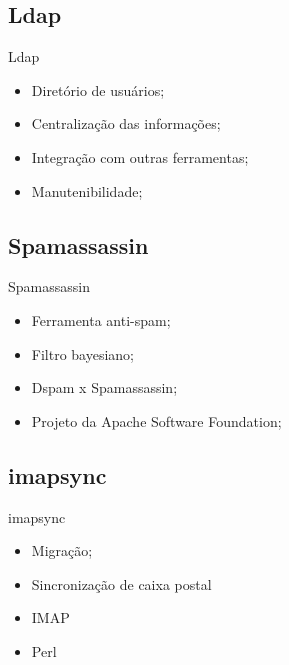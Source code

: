\renewcommand{\titulo}{Ldap}
\subsection{\titulo}
\begin{frame}{\titulo}
\begin{itemize}
\item Diretório de usuários;
\item Centralização das informações;
\item Integração com outras ferramentas;
\item Manutenibilidade;
\end{itemize}
\end{frame}

\renewcommand{\titulo}{Spamassassin}
\subsection{\titulo}
\begin{frame}{\titulo}
\begin{itemize}
\item Ferramenta anti-spam;
\item Filtro bayesiano;
\item Dspam x Spamassassin;
\item Projeto da Apache Software Foundation;
\end{itemize}
\end{frame}

\renewcommand{\titulo}{imapsync}
\subsection{\titulo}
\begin{frame}{\titulo}
\begin{itemize}
\item Migração;
\item Sincronização de caixa postal
\item IMAP
\item Perl
\end{itemize}
\end{frame}
